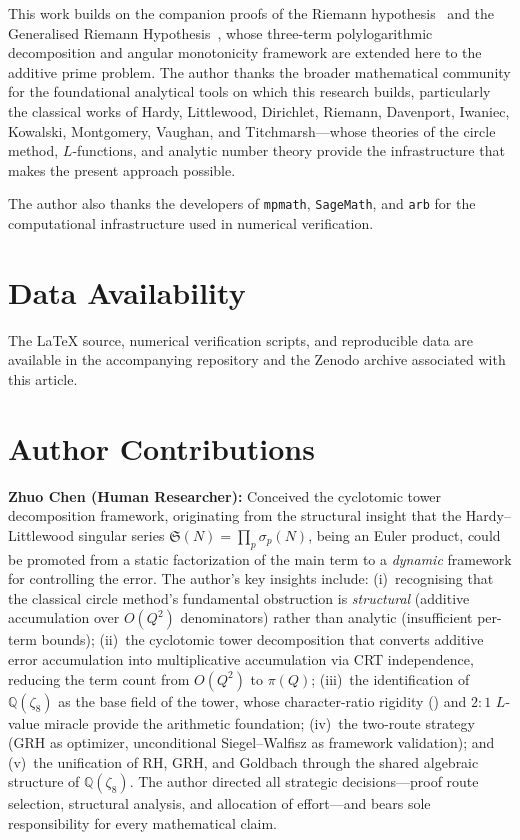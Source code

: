 \documentclass[11pt,a4paper]{article}
\theoremstyle{remark}
\newcommand{\Q}{\mathbb{Q}}
\begin{document}
This work builds on the companion proofs of the Riemann
hypothesis~\cite{Chen2026RH} and the Generalised Riemann
Hypothesis~\cite{Chen2026GRH}, whose three-term polylogarithmic
decomposition and angular monotonicity framework are extended here
to the additive prime problem.  The author thanks the broader
mathematical community for the foundational analytical tools on
which this research builds, particularly the classical works of
Hardy, Littlewood, Dirichlet, Riemann, Davenport, Iwaniec,
Kowalski, Montgomery, Vaughan, and Titchmarsh---whose theories of
the circle method, $L$-functions, and analytic number theory
provide the infrastructure that makes the present approach
possible.

The author also thanks the developers of \texttt{mpmath},
\texttt{SageMath}, and \texttt{arb} for the computational
infrastructure used in numerical verification.

\section*{Data Availability}

The LaTeX source, numerical verification scripts, and reproducible
data are available in the accompanying repository and the Zenodo
archive associated with this article.

\section*{Author Contributions}

\textbf{Zhuo Chen (Human Researcher):}
Conceived the cyclotomic tower decomposition framework, originating
from the structural insight that the Hardy--Littlewood singular
series $\mathfrak{S}(N) = \prod_p \sigma_p(N)$, being an Euler
product, could be promoted from a static factorization of the main
term to a \emph{dynamic} framework for controlling the error.
The author's key insights include:
(i)~recognising that the classical circle method's fundamental
obstruction is \emph{structural} (additive accumulation over
$O(Q^2)$ denominators) rather than analytic (insufficient per-term
bounds);
(ii)~the cyclotomic tower decomposition that converts additive
error accumulation into multiplicative accumulation via CRT
independence, reducing the term count from $O(Q^2)$ to $\pi(Q)$;
(iii)~the identification of $\Q(\zeta_8)$ as the base field of the
tower, whose character-ratio rigidity () and
$2{:}1$ $L$-value miracle provide the arithmetic foundation;
(iv)~the two-route strategy (GRH as optimizer, unconditional
Siegel--Walfisz as framework validation); and
(v)~the unification of RH, GRH, and Goldbach through the shared
algebraic structure of $\Q(\zeta_8)$.
The author directed all strategic decisions---proof route selection,
structural analysis, and allocation of effort---and bears sole
responsibility for every mathematical claim.
\end{document}
